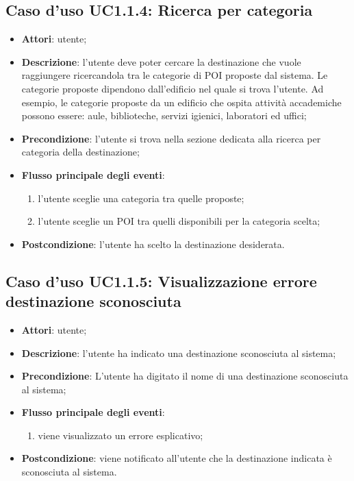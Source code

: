 \documentclass[../AnalisiDeiRequisiti.tex]{subfiles}
\begin{document}
\subsection{Caso d'uso UC1.1.4: Ricerca per categoria}
\begin{itemize}
\item \textbf{Attori}: utente;
\item \textbf{Descrizione}: l'utente deve poter cercare la destinazione che vuole raggiungere ricercandola tra le categorie di POI proposte dal sistema. Le categorie proposte dipendono dall'edificio nel quale si trova l'utente. Ad esempio, le categorie proposte da un edificio che ospita attività accademiche possono essere: aule, biblioteche, servizi igienici, laboratori ed uffici; 
      \item \textbf{Precondizione}: l'utente si trova nella sezione dedicata alla ricerca per categoria della destinazione;

        \item \textbf{Flusso principale degli eventi}:
          \begin{enumerate}
          \item l'utente sceglie una categoria tra quelle proposte;
          \item l'utente sceglie un POI tra quelli disponibili per la categoria scelta;

      \end{enumerate}
    \item \textbf{Postcondizione}: l'utente ha scelto la destinazione desiderata.
  \end{itemize}
\hypertarget{UC1.1.5}{}
\subsection{Caso d'uso UC1.1.5: Visualizzazione errore destinazione sconosciuta}
\begin{itemize}
\item \textbf{Attori}: utente;
\item \textbf{Descrizione}: l'utente ha indicato una destinazione sconosciuta al sistema; 
      \item \textbf{Precondizione}: L'utente ha digitato il nome di una destinazione sconosciuta al sistema;

        \item \textbf{Flusso principale degli eventi}:
          \begin{enumerate}
          \item viene visualizzato un errore esplicativo;

      \end{enumerate}
    \item \textbf{Postcondizione}: viene notificato all'utente che la destinazione indicata è sconosciuta al sistema.
  \end{itemize}
\hypertarget{UC1.2}{}
\end{document}
